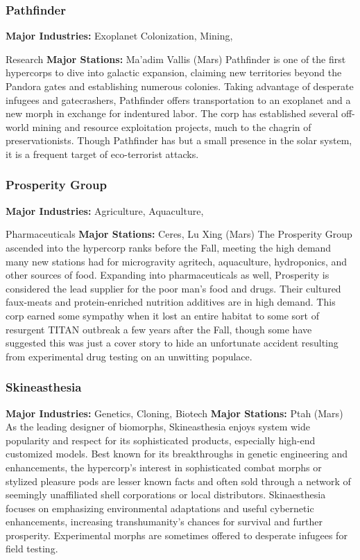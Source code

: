 \subsubsection{Pathfinder}

\textbf{Major Industries:} Exoplanet Colonization, Mining, 

Research
\textbf{Major Stations:} Ma'adim Vallis (Mars)
Pathfinder is one of the first hypercorps to dive into 
galactic expansion, claiming new territories beyond 
the Pandora gates and establishing numerous colonies. 
Taking advantage of desperate infugees and gatecrashers, Pathfinder offers transportation to an exoplanet 
and a new morph in exchange for indentured labor. 
The corp has established several off-world mining and 
resource exploitation projects, much to the chagrin of 
preservationists. Though Pathfinder has but a small 
presence in the solar system, it is a frequent target of 
eco-terrorist attacks.

\subsubsection{Prosperity Group}

\textbf{Major Industries:} Agriculture, Aquaculture, 

Pharmaceuticals
\textbf{Major Stations:} Ceres, Lu Xing (Mars)
The Prosperity Group ascended into the hypercorp 
ranks before the Fall, meeting the high demand 
many new stations had for microgravity agritech, 
aquaculture, hydroponics, and other sources of food. 
Expanding into pharmaceuticals as well, Prosperity is 
considered the lead supplier for the poor man's food 
and drugs. Their cultured faux-meats and protein-enriched nutrition additives are in high demand. This 
corp earned some sympathy when it lost an entire 
habitat to some sort of resurgent TITAN outbreak a 
few years after the Fall, though some have suggested 
this was just a cover story to hide an unfortunate 
accident resulting from experimental drug testing on 
an unwitting populace.

\subsubsection{Skineasthesia}

\textbf{Major Industries:} Genetics, Cloning, Biotech
\textbf{Major Stations:} Ptah (Mars)
As the leading designer of biomorphs, Skineasthesia 
enjoys system wide popularity and respect for its 
sophisticated products, especially high-end customized 
models. Best known for its breakthroughs in genetic 
engineering and enhancements, the hypercorp's 
interest in sophisticated combat morphs or stylized 
pleasure pods are lesser known facts and often sold 
through a network of seemingly unaffiliated shell corporations or local distributors. Skinaesthesia focuses 
on emphasizing environmental adaptations and useful 
cybernetic enhancements, increasing transhumanity's 
chances for survival and further prosperity. Experimental morphs are sometimes offered to desperate 
infugees for field testing.

